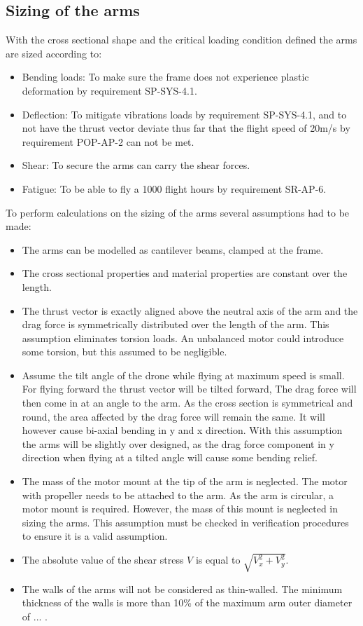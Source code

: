 \subsection{Sizing of the arms}\label{subsec:armsizing}
With the cross sectional shape and the critical loading condition defined the arms are sized according to:
\begin{itemize}[noitemsep,nolistsep]
    \item Bending loads: To make sure the frame does not experience plastic deformation by requirement SP-SYS-4.1.
    \item Deflection: To mitigate vibrations loads by requirement SP-SYS-4.1, and to not have the thrust vector deviate thus far that the flight speed of 20m/s by requirement POP-AP-2 can not be met.
    \item Shear: To secure the arms can carry the shear forces.
    \item Fatigue: To be able to fly a 1000 flight hours by requirement SR-AP-6.
   
\end{itemize}
 
To perform calculations on the sizing of the arms several assumptions had to be made:
\begin{itemize}[noitemsep,nolistsep]
    \item The arms can be modelled as cantilever beams, clamped at the frame. 
    \item The cross sectional properties and material properties are constant over the length. 
    \item The thrust vector is exactly aligned above the neutral axis of the arm and the drag force is symmetrically distributed over the length of the arm. This assumption eliminates torsion loads. An unbalanced motor could introduce some torsion, but this assumed to be negligible.
    \item Assume the tilt angle of the drone while flying at maximum speed is small. For flying forward the thrust vector will be tilted forward, The drag force will then come in at an angle to the arm. As the cross section is symmetrical and round, the area affected by the drag force will remain the same. It will however cause bi-axial bending in y and x direction. With this assumption the arms will be slightly over designed, as the drag force component in y direction when flying at a tilted angle will cause some bending relief. 
    \item The mass of the motor mount at the tip of the arm is neglected. The motor with propeller needs to be attached to the arm. As the arm is circular, a motor mount is required. However, the mass of this mount is neglected in sizing the arms. This assumption must be checked in verification procedures to ensure it is a valid assumption.
    \item The absolute value of the shear stress $V$ is equal to $\sqrt{V_x^2 + V_y^2}$.
    \item The walls of the arms will not be considered as thin-walled. The minimum thickness of the walls is more than 10\% of the maximum arm outer diameter of ... .

\end{itemize}

